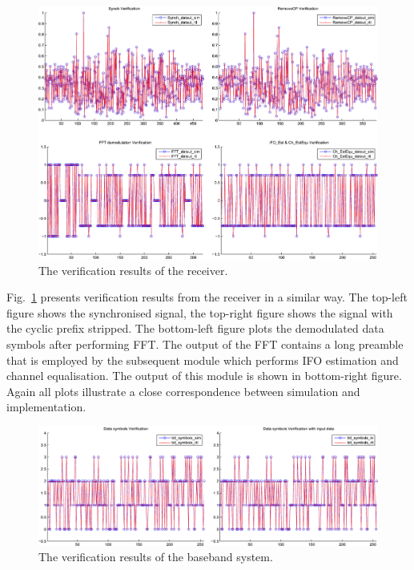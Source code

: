 \begin{figure}
	\includegraphics[width=1\columnwidth]{Figures/Rx_Verification.pdf}
	\caption{The verification results of the receiver.}
	\label{fig:RX_Ver}
\end{figure}

Fig.~\ref{fig:RX_Ver} presents verification results from the receiver in a similar way. The top-left figure shows the synchronised signal, the top-right figure shows the signal with the cyclic prefix stripped. The bottom-left figure plots the demodulated data symbols after performing FFT. The output of the FFT contains a long preamble that is employed by the subsequent module which performs IFO estimation and channel equalisation. The output of this module is shown in bottom-right figure. Again all plots illustrate a close correspondence between simulation and implementation.

\begin{figure}
	\includegraphics[width=1\columnwidth]{Figures/Sys_Verification.pdf}
	\caption{The verification results of the baseband system.}
	\label{fig:Sys_Ver}
\end{figure}

